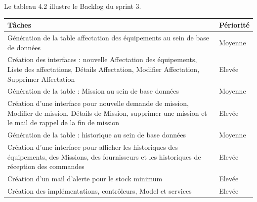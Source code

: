 Le tableau 4.2 illustre le Backlog du sprint 3.
\newpage
    
            \begin{longtable}{|m{8cm}|m{4cm}|}
                
                \hline 
                    \textbf{Tâches} & \textbf{Périorité}\\
                \hline
                \endhead
                 \endfoot
                  \endlastfoot
                \hline  
                    Génération de la table affectation des équipements au sein de base de données 
                    & Moyenne\\
            
            
                \hline
                    Création des interfaces : nouvelle Affectation des équipements, Liste des affectations, Détails Affectation, Modifier Affectation, Supprimer Affectation
                    & Elevée\\
                    
                    
                \hline
                    Génération de la table : Mission au sein de base données
                    & Moyenne\\
                
                \hline  
                    Création d’une interface pour nouvelle demande de mission, Modifier de mission, Détails de Mission, supprimer une mission et le mail de rappel de la fin de mission 
                    & Elevée\\
            
                \hline
                    Génération de la table : historique au sein de base données
                    & Moyenne\\
                    
                \hline
                    Création d’une interface pour afficher les historiques des équipements, des Missions, des fournisseurs et les historiques de réception des commandes
                    & Elevée\\
                    

                \hline
                    Création d’un mail d’alerte pour le stock minimum
                    & Elevée\\
                    

                \hline
                    Création des implémentations, contrôleurs, Model et services
                    & Elevée\\
                    


\end{longtable}
